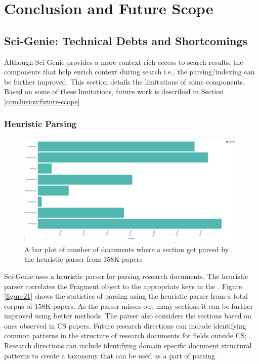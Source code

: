 \chapter{Conclusion and Future Scope}
\label{conclusion}

\section{Sci-Genie: Technical Debts and Shortcomings}
Although Sci-Genie provides a more context rich access to search results, the components that help enrich context during search i.e., the parsing/indexing can be further improved. This section details the limitations of some components. Based on some of these limitations, future work is described in Section \ref{conclusion:future-scope}

\subsection{Heuristic Parsing}
\begin{figure}[h]
    \centering
    \includegraphics[width=\maxwidth{\textwidth}]{src/images/parsing-stats.pdf}
    \caption{ A bar plot of number of documents where a section got parsed by the heuristic parser from 158K papers}
    \label{figure\arabic{figurecounter}}
\end{figure}
Sci-Genie uses a heuristic parser for parsing research documents. The heuristic parser correlates the Fragment object to the appropriate keys in the . Figure \ref{figure21} shows the statistics of parsing using the heuristic parser from a total corpus of 158K papers. As the parser misses out many sections it can be further improved using better methods. The parser also considers the sections based on ones observed in CS papers. Future research directions can include identifying common patterns in the structure of research documents for fields outside CS; Research directions can include identifying domain specific document structural patterns to create a taxonomy that can be used as a part of parsing.


